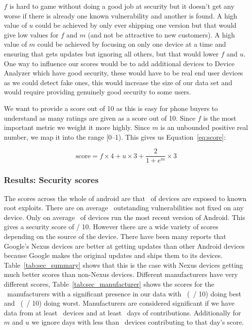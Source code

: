 $f$ is hard to game without doing a good job at security but it doesn't get any worse if there is already one known vulnerability and another is found.
A high value of $u$ could be achieved by only ever shipping one version but that would give low values for $f$ and $m$ (and not be attractive to new customers).
A high value of $m$ could be achieved by focusing on only one device at a time and ensuring that gets updates but ignoring all others, but that would lower $f$ and $u$.
One way to influence our scores would be to add additional devices to Device Analyzer which have good security, these would have to be real end user devices as we could detect fake ones, this would increase the size of our data set and would require providing genuinely good security to some users.

We want to provide a score out of 10 as this is easy for phone buyers to understand as many ratings are given as a score out of 10.
Since $f$ is the most important metric we weight it more highly.
Since $m$ is an unbounded positive real number, we map it into the range [0--1).
This gives us Equation~\ref{eq:score}:

\begin{equation}
\mathrm{score} = f\times 4 + u \times 3 + \frac{2}{1+e^m} \times 3 \label{eq:score}
\end{equation}

\subsubsection{Results: Security scores}
The scores across the whole of android are that \daMeanInsecurityPerc\ of devices are exposed to known root exploits.
There are on average \daMeanOutstandingVulnerabilities\ outstanding vulnerabilities not fixed on any device.
Only on average \daUpdatednessPerc\ of devices run the most recent version of Android.
This gives a security score of \daSecurityScore / 10.
\daTabSecScoressummary
However there are a wide variety of scores depending on the source of the device.
There have been many reports that Google's Nexus devices are better at getting updates than other Android devices because Google makes the original updates and ships them to its devices.
Table~\ref{tab:sec_summary} shows that this is the case with Nexus devices getting much better scores than non-Nexus devices.
\daTabSecScoresmanufacturer
Different manufacturers have very different scores, Table~\ref{tab:sec_manufacturer} shows the scores for the \daNumSigManufacturers\ manufacturers with a significant presence in our data with \daSecScoreBestmanufacturer\ (\daSecScoreBestmanufacturerScore\ / 10) doing best and \daSecScoreWorstmanufacturer\ (\daSecScoreWorstmanufacturerScore\ / 10) doing worst.
Manufacturers are considered significant if we have data from at least \daSigNumDevices\ devices and at least \daSigNumDeviceDays\ days of contributions.
Additionally for $m$ and $u$ we ignore days with less than \daSigNumDevicesDay\ devices contributing to that day's score.

